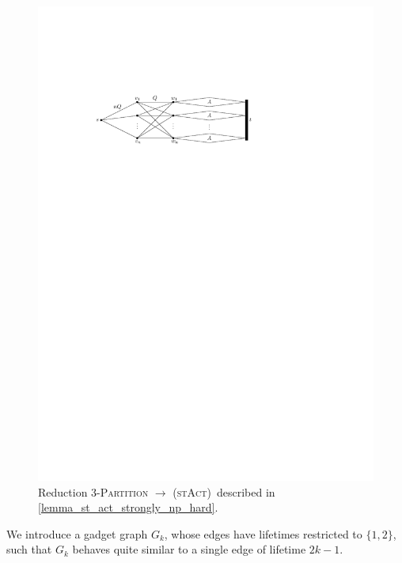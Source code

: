 \documentclass[10pt,a4paper]{article}
\numberwithin{equation}{section}
\newcommand{\set}[1]{\{ #1 \}}
\newcommand{\stact}{\textsc{(stAct)}}
\begin{document}
\begin{figure}[htpb]
\centering
\includegraphics[scale=1]{img/st-act-strongly-np-hard}
\caption{Reduction \textsc{3-Partition} $\rightarrow$ \stact\ described in \cref{lemma_st_act_strongly_np_hard}.}
\label{fig_stact_strongly_np_hard}
\end{figure}

We introduce a gadget graph $G_k$, whose edges have lifetimes restricted to $\set{1,2}$, such that $G_k$ behaves quite similar to a single edge of lifetime $2k - 1$.
\end{document}
